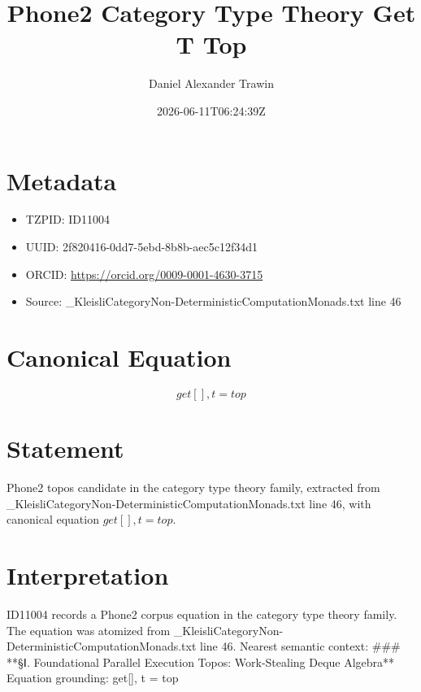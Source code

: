 \documentclass[11pt]{article}
\title{Phone2 Category Type Theory Get T Top}
\author{Daniel Alexander Trawin}
\date{2026-06-11T06:24:39Z}
\begin{document}
\maketitle
\section*{Metadata}
\begin{itemize}
\item TZPID: ID11004
\item UUID: 2f820416-0dd7-5ebd-8b8b-aec5c12f34d1
\item ORCID: \url{https://orcid.org/0009-0001-4630-3715}
\item Source: _KleisliCategoryNon-DeterministicComputationMonads.txt line 46
\end{itemize}
\section*{Canonical Equation}
\[
get[], t = top
\]
\section*{Statement}
Phone2 topos candidate in the category type theory family, extracted from _KleisliCategoryNon-DeterministicComputationMonads.txt line 46, with canonical equation $get[], t = top$.
\section*{Interpretation}
ID11004 records a Phone2 corpus equation in the category type theory family. The equation was atomized from _KleisliCategoryNon-DeterministicComputationMonads.txt line 46. Nearest semantic context: ### **§Ⅰ. Foundational Parallel Execution Topos: Work-Stealing Deque Algebra** Equation grounding: get[], t = top
\end{document}
